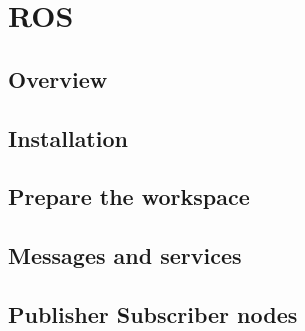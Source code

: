 
\chapter{ROS}

%
\section{Overview}

%
\section{Installation}

%
\section{Prepare the workspace}

%
\section{Messages and services}

%
\section{Publisher Subscriber nodes}

%
